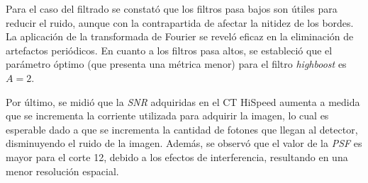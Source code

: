 \documentclass[11pt, twocolumn]{article}
\begin{document}
Para el caso del filtrado se constató que los filtros pasa bajos son útiles para reducir el ruido, aunque con la contrapartida de afectar la nitidez de los bordes. La aplicación de la transformada de Fourier se reveló eficaz en la eliminación de artefactos periódicos. En cuanto a los filtros pasa altos, se estableció que el parámetro óptimo (que presenta una métrica menor) para el filtro \textit{highboost} es $A = 2$.

Por último, se midió que la \textit{SNR} adquiridas en el CT HiSpeed aumenta a medida que se incrementa la corriente utilizada para adquirir la imagen, lo cual es esperable dado a que se incrementa la cantidad de fotones que llegan al detector, disminuyendo el ruido de la imagen. Además, se observó que el valor de la \textit{PSF} es mayor para el corte 12, debido a los efectos de interferencia, resultando en una menor resolución espacial.
\end{document}
